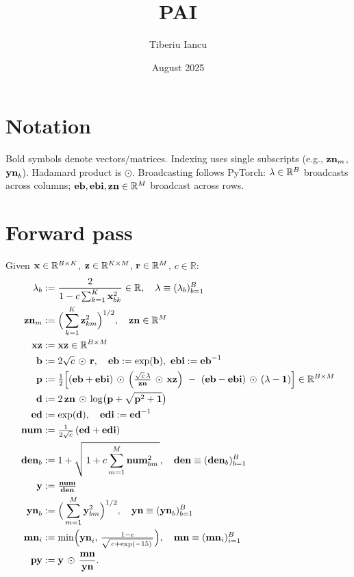 \documentclass{article}
\title{PAI}
\author{Tiberiu Iancu}
\date{August 2025}
\begin{document}
\maketitle

\section*{Notation}
\newcommand{\ddfrac}[2]{\frac{\partial #1}{\partial #2}}
\newcommand{\had}{\odot}
\newcommand{\colnorm}[1]{\|#1\|_{1,\text{col}}}
\newcommand{\rownorm}[1]{\|#1\|_{1,\text{row}}}

Bold symbols denote vectors/matrices. Indexing uses single subscripts (e.g., $\v{zn}{m}$, $\v{yn}{b}$). Hadamard product is $\had$. Broadcasting follows PyTorch: $\v{\lambda}\in\mathbb{R}^B$ broadcasts across columns; $\v{eb},\v{ebi},\v{zn}\in\mathbb{R}^M$ broadcast across rows.

\section{Forward pass}

Given $\v{x}\in\mathbb{R}^{B\times K}$, $\v{z}\in\mathbb{R}^{K\times M}$, $\v{r}\in\mathbb{R}^{M}$, $c\in\mathbb{R}$:
\begin{align}
\lambda_b &:= \frac{2}{1 - c\sum_{k=1}^K \v{x}{bk}^2}\in\mathbb{R},\quad \v{\lambda}\equiv(\lambda_b)_{b=1}^B \\
\v{zn}{m} &:= \Big(\sum_{k=1}^K \v{z}{km}^2\Big)^{1/2},\quad \v{zn}\in\mathbb{R}^M \\
\v{xz} &:= \v{x}\v{z}\in\mathbb{R}^{B\times M} \\
\v{b} &:= 2\sqrt{c}\,\had\,\v{r},\quad
\v{eb}:=\exp(\v{b}),\ \v{ebi}:=\v{eb}^{-1} \\
\v{p} &:= \tfrac12\Big[(\v{eb}+\v{ebi})\,\had\,\Big( \tfrac{\sqrt{c}\,\v{\lambda}}{\v{zn}} \,\had\, \v{xz}\Big)\ -\ (\v{eb}-\v{ebi})\,\had\,(\v{\lambda}-\mathbf{1})\Big] \in \mathbb{R}^{B\times M} \\
\v{d} &:= 2\,\v{zn}\,\had\, \log\!\big(\v{p}+\sqrt{\v{p}^2+\mathbf{1}}\big) \\
\v{ed} &:= \exp(\v{d}),\quad \v{edi}:=\v{ed}^{-1} \\
\v{num} &:= \tfrac{1}{2\sqrt{c}}\,(\v{ed}+\v{edi}) \\
\v{den}{b} &:= 1 + \sqrt{\,1 + c \sum_{m=1}^M \v{num}{bm}^2\,},\quad \v{den}\equiv(\v{den}{b})_{b=1}^B \\
\v{y} &:= \tfrac{\v{num}}{\v{den}} \\
\v{yn}_b &:= \Big(\sum_{m=1}^M \v{y}{bm}^2\Big)^{1/2},\quad \v{yn}\equiv(\v{yn}_b)_{b=1}^B \\
\v{mn}_i &:= \min\!\Big(\v{yn}{i},\,\tfrac{1-\epsilon}{\sqrt{\,c+\exp(-15)\,}}\Big),\quad \v{mn}\equiv(\v{mn}_i)_{i=1}^B \\
\v{py} &:= \v{y}\,\had\,\frac{\v{mn}}{\v{yn}}.
\end{align}
\end{document}

